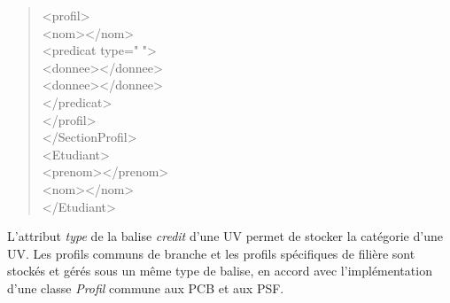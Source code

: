 \documentclass[a4paper,10pt,french]{report}
\begin{document}
\begin{quote}
	\hspace*{1cm}<profil>\\
	\hspace*{1cm}\hspace*{1cm}	<nom></nom>		\\
	\hspace*{1cm}\hspace*{1cm}	<predicat type=" "> \\
		\hspace*{1cm}\hspace*{1cm}\hspace*{1cm}	<donnee></donnee>\\
		\hspace*{1cm}\hspace*{1cm}\hspace*{1cm}	<donnee></donnee>\\
		\hspace*{1cm}\hspace*{1cm}</predicat>\\
	\hspace*{1cm}</profil>\\
</SectionProfil>\\
<Etudiant>\\
	\hspace*{1cm}<prenom></prenom>\\
	\hspace*{1cm}<nom></nom>\\
</Etudiant>\\
		\end{quote}
		
	L'attribut \emph{type} de la balise \emph{credit} d'une UV permet de stocker la catégorie d'une UV.
	Les profils communs de branche et les profils spécifiques de filière sont stockés et gérés sous un même type de balise, en accord avec l'implémentation d'une classe \emph{Profil} commune aux PCB et aux PSF.\\\\
	
\end{document}
